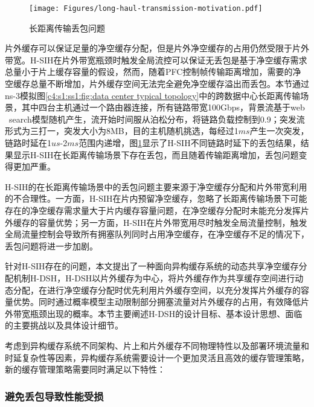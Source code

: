 \begin{figure}[H]
  \centering
  \texttt{[image: Figures/long-haul-transmission-motivation.pdf]}
  \caption{长距离传输丢包问题}
  \label{c4:s1:ss1:fig:long haul packet loss}
\end{figure}


片外缓存可以保证足量的净空缓存分配，但是片外净空缓存的占用仍然受限于片外带宽。H-SIH在片外带宽瓶颈时触发全局流控可以保证无丢包是基于净空缓存需求总量小于片上缓存容量的假设，然而，随着PFC控制帧传输距离增加，需要的净空缓存总量不断增加，片外缓存空间无法完全避免净空缓存溢出而丢包。本节通过ns-3模拟图\ref{c4:s1:ss1:fig:data center typical topology}中的跨数据中心长距离传输场景，其中四台主机通过一个路由器连接，所有链路带宽100Gbps，背景流基于web \ search\cite{SIGCOMM10DCTCP}模型随机产生，流开始时间服从泊松分布，将链路负载控制到0.9；突发流形式为三打一，突发大小为8MB，目的主机随机挑选，每经过1$ms$产生一次突发，链路时延在1$us$-2$ms$范围内递增，图\ref{c4:s1:ss1:fig:long haul packet loss}显示了H-SIH不同链路时延下的丢包结果，结果显示H-SIH在长距离传输场景下存在丢包，而且随着传输距离增加，丢包问题变得更加严重。

H-SIH的在长距离传输场景中的丢包问题主要来源于净空缓存分配和片外带宽利用的不合理性。一方面，H-SIH在片内预留净空缓存，忽略了长距离传输场景下可能存在的净空缓存需求量大于片内缓存容量问题，在净空缓存分配时未能充分发挥片外缓存的容量优势；另一方面，H-SIH在片外带宽用尽时触发全局流量控制，触发全局流量控制会导致所有拥塞队列同时占用净空缓存，在净空缓存不足的情况下，丢包问题将进一步加剧。


\label{c4:s3:hdsh design}

针对H-SIH存在的问题，本文提出了一种面向异构缓存系统的动态共享净空缓存分配机制H-DSH，H-DSH以片外缓存为中心，将片外缓存作为共享缓存空间进行动态分配，在进行净空缓存分配时优先利用片外缓存空间，以充分发挥片外缓存的容量优势。同时通过概率模型主动限制部分拥塞流量对片外缓存的占用，有效降低片外带宽瓶颈出现的概率。本节主要阐述H-DSH的设计目标、基本设计思想、面临的主要挑战以及具体设计细节。


考虑到异构缓存系统不同架构、片上和片外缓存不同物理特性以及部署环境流量和时延复杂性等因素，异构缓存系统需要设计一个更加灵活且高效的缓存管理策略，新的缓存管理策略需要同时满足以下特性：

\subsubsection{避免丢包导致性能受损}

